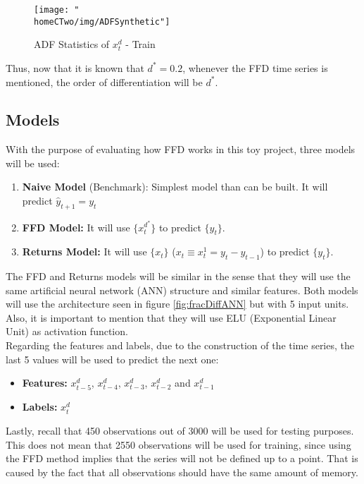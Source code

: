 \documentclass[a4paper]{report}
\newcommand{\homeCTwo}{../../Chapter 2 - FracDiff/Draft}
\begin{document}
\begin{figure}[htbp]
	\centering
	\texttt{[image: "\\homeCTwo/img/ADFSynthetic"]}
	\caption{ADF Statistics of $x_t^d$ - Train}
	\label{fig:ADFSynthetic}
\end{figure}

Thus, now that it is known that $d^* = 0.2$, whenever the FFD time series is 
mentioned, the order of differentiation will be $d^*$.

\newpage

\subsection{Models}
With the purpose of evaluating how FFD works in this toy project, three 
models will be used:

\begin{enumerate}
	\item \textbf{Naive Model} (Benchmark): Simplest model than can be 
	built. It will predict $\widehat{y}_{t+1} = y_t$
	
	\item \textbf{FFD Model:} It will use $\{ x_t^{d^*} \}$ to predict 
	$\{ y_t \}$.
	
	\item \textbf{Returns Model:} It will use $\{ x_t \}$ 
	($x_t \equiv x_t^{1} = y_t - y_{t-1}$) to predict $\{ y_t \}$.
\end{enumerate}

The FFD and Returns models will be similar in the sense that they will use 
the same artificial neural network (ANN) structure and similar features. Both 
models will use the architecture seen in figure \ref{fig:fracDiffANN} but 
with 5 input units. Also, it is important to mention that they will use ELU 
(Exponential Linear Unit) as activation function.\\

Regarding the features and labels, due to the construction of the time 
series, the last 5 values will be used to predict the next one:
\begin{itemize}
	\item \textbf{Features:} $x_{t-5}^d$, $x_{t-4}^d$, $x_{t-3}^d$, 
	$x_{t-2}^d$ and $x_{t-1}^d$
	\item \textbf{Labels:} $x_{t}^d$
\end{itemize}

Lastly, recall that 450 observations out of 3000 will be used for testing 
purposes. This does not mean that 2550 observations will be used for 
training, since using the FFD method implies that the series will not be 
defined up to a point. That is caused by the fact that all observations 
should have the same amount of memory.
\end{document}
